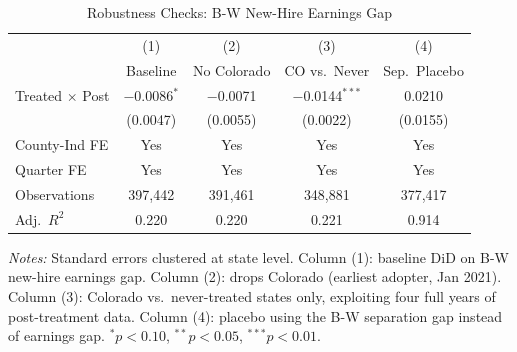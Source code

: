 \begin{table}[t]
\centering
\caption{Robustness Checks: B-W New-Hire Earnings Gap}
\label{tab:robustness}
\small
\begin{tabular}{lcccc}
\toprule
 & (1) & (2) & (3) & (4) \\
 & Baseline & No Colorado & CO vs.\ Never & Sep.\ Placebo \\
\midrule
Treated $\times$ Post & $-$0.0086$^{*}$ & $-$0.0071 & $-$0.0144$^{***}$ & 0.0210 \\
 & (0.0047) & (0.0055) & (0.0022) & (0.0155) \\
\midrule
County-Ind FE & Yes & Yes & Yes & Yes \\
Quarter FE & Yes & Yes & Yes & Yes \\
Observations & 397,442 & 391,461 & 348,881 & 377,417 \\
Adj.\ $R^2$ & 0.220 & 0.220 & 0.221 & 0.914 \\
\bottomrule
\end{tabular}
\begin{tablenotes}
\item \textit{Notes:} Standard errors clustered at state level. Column (1): baseline DiD on B-W new-hire earnings gap. Column (2): drops Colorado (earliest adopter, Jan 2021). Column (3): Colorado vs.\ never-treated states only, exploiting four full years of post-treatment data. Column (4): placebo using the B-W separation gap instead of earnings gap. $^{*}p<0.10$, $^{**}p<0.05$, $^{***}p<0.01$.
\end{tablenotes}
\end{table}
